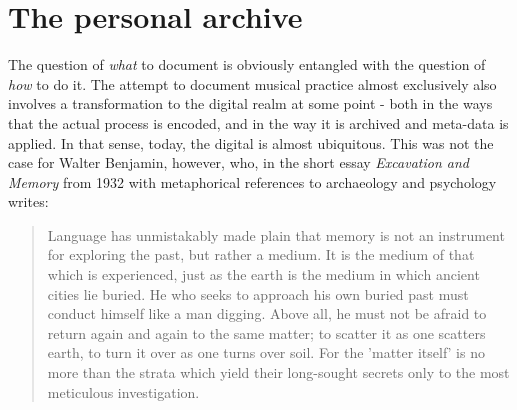 \documentclass[11pt,a4paper]{article}
\begin{document}




\section*{The personal archive}
\label{sec:archiving-practice}


The question of \emph{what} to document is obviously entangled with the question of \emph{how} to do it. The attempt to document musical practice almost exclusively also involves a transformation to the digital realm at some point - both in the ways that the actual process is encoded, and in the way it is archived and meta-data is applied. In that sense, today, the digital is almost ubiquitous.
This was not the case for Walter Benjamin, however, who, in the short essay \emph{Excavation and Memory} from 1932 with metaphorical references to archaeology and psychology writes:

\begin{quote}
Language has unmistakably made plain that memory is not an instrument for exploring the past, but rather a medium. It is the medium of that which is experienced, just as the earth is the medium in which ancient cities lie buried. He who seeks to approach his own buried past must conduct himself like a man digging. Above all, he must not be afraid to return again and again to the same matter; to scatter it as one scatters earth, to turn it over as one turns over soil. For the 'matter itself' is no more than the strata which yield their long-sought secrets only to the most meticulous investigation. \citep[p. 576]{benjamin2005}
\end{quote}
\end{document}
